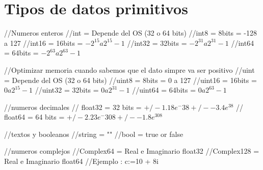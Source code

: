 \documentclass{article}
\begin{document}
\section{Tipos de datos primitivos} 
//Numeros enteros
//int = Depende del OS (32 o 64 bits)
//int8 = 8bits = -128 a 127
//int16 = 16bits = $-2^15 a 2^15-1$
//int32 = 32bits = $-2^31 a 2^31-1$
//int64 = 64bits = $-2^63 a 2^63-1$

//Optimizar memoria cuando sabemos que el dato simpre va ser positivo
//uint = Depende del OS (32 o 64 bits)
//uint8 = 8bits = 0 a 127
//uint16 = 16bits = $0 a 2^15-1$
//uint32 = 32bits = $0 a 2^31-1$
//uint64 = 64bits = $0 a 2^63-1$

//numeros decimales
// float32 = 32 bits = $+/- 1.18e^-38 +/- -3.4e^38$
// float64 = 64 bits = $+/- 2.23e^-308 +/- -1.8e^308$

//textos y booleanos
//string = ""
//bool = true or false

//numeros complejos
//Complex64 = Real e Imaginario float32
//Complex128 = Real e Imaginario float64
//Ejemplo : c:=10 + 8i
\end{document}
